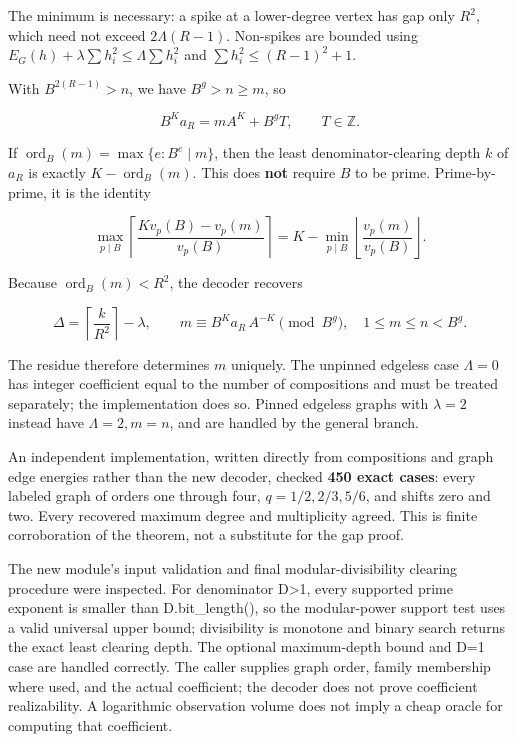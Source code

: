 \documentclass[
  11pt,
  a4paper,
]{report}
\begin{document}
The minimum is necessary: a spike at a lower-degree vertex has gap only
\(R^2\), which need not exceed \(2\Lambda(R-1)\). Non-spikes are bounded
using \(E_G(h)+\lambda\sum h_i^2\le\Lambda\sum h_i^2\) and
\(\sum h_i^2\le(R-1)^2+1\).

With \(B^{2(R-1)}>n\), we have \(B^g>n\ge m\), so

\[
 B^K a_R=mA^K+B^gT,\qquad T\in\mathbb Z.
\]

If \(\operatorname{ord}_B(m)=\max\{e:B^e\mid m\}\), then the least
denominator-clearing depth \(k\) of \(a_R\) is exactly
\(K-\operatorname{ord}_B(m)\). This does \textbf{not} require \(B\) to
be prime. Prime-by-prime, it is the identity

\[
 \max_{p\mid B}\left\lceil\frac{K v_p(B)-v_p(m)}{v_p(B)}\right\rceil
 =K-\min_{p\mid B}\left\lfloor\frac{v_p(m)}{v_p(B)}\right\rfloor.
\]

Because \(\operatorname{ord}_B(m)<R^2\), the decoder recovers

\[
 \Delta=\left\lceil\frac{k}{R^2}\right\rceil-\lambda,
 \qquad
 m\equiv B^K a_R\,A^{-K}\pmod{B^g},\quad 1\le m\le n<B^g.
\]

The residue therefore determines \(m\) uniquely. The unpinned edgeless
case \(\Lambda=0\) has integer coefficient equal to the number of
compositions and must be treated separately; the implementation does so.
Pinned edgeless graphs with \(\lambda=2\) instead have
\(\Lambda=2,m=n\), and are handled by the general branch.

An independent implementation, written directly from compositions and
graph edge energies rather than the new decoder, checked \textbf{450
exact cases}: every labeled graph of orders one through four,
\(q=1/2,2/3,5/6\), and shifts zero and two. Every recovered maximum
degree and multiplicity agreed. This is finite corroboration of the
theorem, not a substitute for the gap proof.

The new module's input validation and final modular-divisibility
clearing procedure were inspected. For denominator D\textgreater1, every
supported prime exponent is smaller than D.bit\_length(), so the
modular-power support test uses a valid universal upper bound;
divisibility is monotone and binary search returns the exact least
clearing depth. The optional maximum-depth bound and D=1 case are
handled correctly. The caller supplies graph order, family membership
where used, and the actual coefficient; the decoder does not prove
coefficient realizability. A logarithmic observation volume does not
imply a cheap oracle for computing that coefficient.
\end{document}
